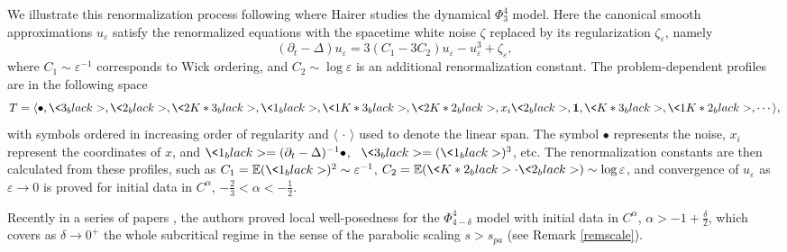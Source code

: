 \documentclass[11 pt,reqno]{amsart}
\theoremstyle{definition}
\theoremstyle{remark}
\numberwithin{equation}{section}
\begin{document}
We illustrate this renormalization process following \cite{Hairer, Hairer3, Hairer4} where Hairer studies the dynamical $\Phi^4_3$ model. Here the canonical smooth approximations $u_\varepsilon$ satisfy the renormalized equations with the spacetime white noise $\zeta$ replaced by its regularization $\zeta_\varepsilon$, namely
\begin{equation}\label{parab1}
(\partial_t-\Delta)u_\varepsilon =3(C_1-3C_2) u_\varepsilon -u_\varepsilon^3 + \zeta_\varepsilon, 
\end{equation}
where $C_1\sim \varepsilon^{-1}$ corresponds to Wick ordering, and $C_2\sim\log \varepsilon$ is an additional renormalization constant. The problem-dependent profiles are in the following space 
\begin{equation}
T=\langle\bullet, \<3_black>, \<2_black>, \<2K*3_black>, \<1_black>, \<1K*3_black>, \<2K*2_black>, x_i \<2_black>, \mathbf{1}, \<K*3_black>, \<1K*2_black>, \cdots\rangle,
\end{equation}
with symbols ordered in increasing order of regularity and $\langle\, \cdot \, \rangle$ used to denote the linear span. The symbol $\bullet$ represents the noise, $x_i$ represent the coordinates of $x$, and $\<1_black> = (\partial_t-\Delta)^{-1} \bullet$, \, $\<3_black>= (\<1_black>)^3$, etc. The renormalization constants are then calculated from these profiles, such as $C_1= \mathbb{E}(\<1_black>)^2\sim \varepsilon^{-1}$, $C_2=\mathbb{E}(\<K*2_black>\cdot\<2_black>)\sim\log \varepsilon$, and convergence of $u_\varepsilon$ as $\varepsilon\to 0$ is proved for initial data in $C^\alpha$, $-\frac{2}{3}<\alpha<-\frac{1}{2}$.


Recently in a series of papers \cite{BCCH}\cite{BHZ}\cite{CMW}, the authors proved local well-posedness for the $\Phi^4_{4-\delta}$ model with initial data in $C^\alpha$, $\alpha>-1+\frac{\delta}{2}$, which covers as $\delta\to 0^+$ the whole subcritical regime in the sense of the parabolic scaling $s>s_{pa}$ (see Remark \ref{remscale}). 
\end{document}
